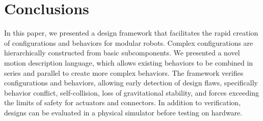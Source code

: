 \documentclass[graybox]{svmult}
\begin{document}
% 
%   
\section{Conclusions}
In this paper, we presented a design framework that facilitates the rapid creation
of configurations and behaviors for modular robots.
Complex configurations  are hierarchically constructed from basic
subcomponents.
We presented a novel motion description language, which allows existing behaviors
to be combined in series and parallel  to create more complex  behaviors.
The framework verifies  configurations and behaviors, allowing
early detection of  design flaws, specifically behavior conflict, self-collision, loss of gravitational stability, and forces 
exceeding the limits of safety for actuators and connectors. In addition to verification, designs can be evaluated in a physical simulator before testing on
hardware.
\end{document}
